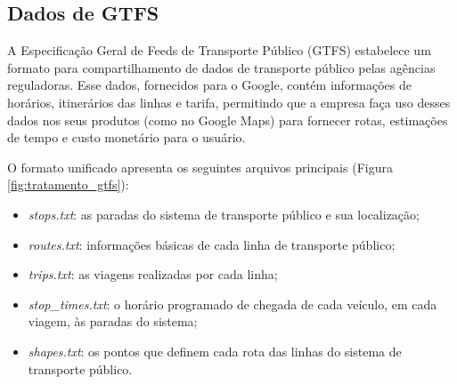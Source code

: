 \documentclass[        
    a4paper,          %
    12pt,             %
    chapter=TITLE,    %
    section=Title,    %
    subsection=Title, %
    oneside,          %
    english,          %
    spanish,          %
    brazil,           %
    fleqn             %
]{abntex2}
\begin{document}
  \begin{table}[!h]
  \captionsetup{width=10cm}%
    \end{table}
  
  \hypertarget{dados-de-gtfs}{%
  \subsection{Dados de GTFS}\label{dados-de-gtfs}}
  
  A Especificação Geral de Feeds de Transporte Público (GTFS) estabelece um formato para compartilhamento de dados de transporte público pelas agências reguladoras. Esse dados, fornecidos para o Google, contém informações de horários, itinerários das linhas e tarifa, permitindo que a empresa faça uso desses dados nos seus produtos (como no Google Maps) para fornecer rotas, estimações de tempo e custo monetário para o usuário.
  
  O formato unificado apresenta os seguintes arquivos principais (Figura \ref{fig:tratamento_gtfs}):
  
  \begin{itemize}
  \tightlist
  \item
    \emph{stops.txt}: as paradas do sistema de transporte público e sua localização;
  \item
    \emph{routes.txt}: informações básicas de cada linha de transporte público;
  \item
    \emph{trips.txt}: as viagens realizadas por cada linha;
  \item
    \emph{stop\_times.txt}: o horário programado de chegada de cada veículo, em cada viagem, às paradas do sistema;
  \item
    \emph{shapes.txt}: os pontos que definem cada rota das linhas do sistema de transporte público.
  \end{itemize}
  
\end{document}
